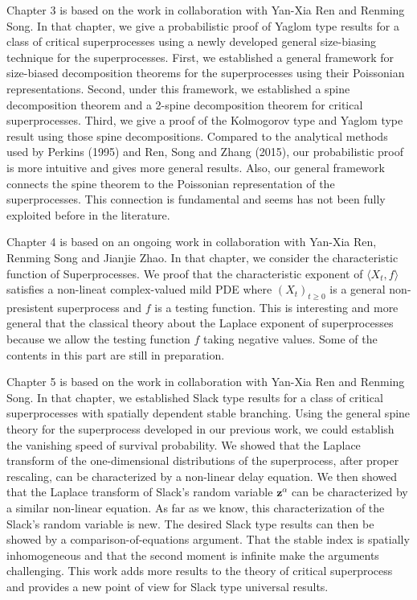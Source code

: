     Chapter 3 is based on the work \cite{RenSongSun2017Spine} in collaboration with Yan-Xia Ren and Renming Song. In that chapter, we give a probabilistic proof of Yaglom type results for a class of critical superprocesses using a newly developed general size-biasing technique for the superprocesses. First, we established a general framework for size-biased decomposition theorems for the superprocesses using their Poissonian representations. Second, under this framework, we established a spine decomposition theorem and a 2-spine decomposition theorem for critical superprocesses. Third, we give a proof of the Kolmogorov type and Yaglom type result using those spine decompositions.  Compared to the analytical methods used by Perkins (1995) and Ren, Song and Zhang (2015), our probabilistic proof is more intuitive and gives more general results. Also, our general framework connects the spine theorem to the Poissonian representation of the superprocesses. This connection is fundamental and seems has not been fully exploited before in the literature. 

    Chapter 4 is based on an ongoing work in collaboration with Yan-Xia Ren, Renming Song and Jianjie Zhao. In that chapter, we consider the characteristic function of Superprocesses. We proof that the characteristic exponent of $\langle X_t,f\rangle$ satisfies a non-lineat complex-valued mild PDE where $(X_t)_{t\geq 0}$ is a general non-presistent superprocess and $f$ is a testing function. This is interesting and more general that the classical theory about the Laplace exponent of superprocesses because we allow the testing function $f$ taking negative values. Some of the contents in this part are still in preparation.

    
    Chapter 5 is based on the work \cite{RenSongSun2018Limit} in collaboration with Yan-Xia Ren and Renming Song. In that chapter, we established Slack type results for a class of critical superprocesses with spatially dependent stable branching.
    Using the general spine theory for the superprocess developed in our previous work, we could establish the vanishing speed of survival probability. 
    We showed that the Laplace transform of the one-dimensional distributions of the superprocess, after proper rescaling, can be characterized by a non-linear delay equation. 
    We then showed that the Laplace transform of Slack's random variable $\mathbf z^{\alpha}$ can be characterized by a similar non-linear equation. 
    As far as we know, this characterization of the Slack's random variable is new.
    The desired Slack type results can then be showed by a comparison-of-equations argument.
    That the stable index is spatially inhomogeneous and that the second moment is infinite make the arguments challenging.
    This work adds more results to the theory of critical superprocess and provides a new point of view for Slack type universal results. 

